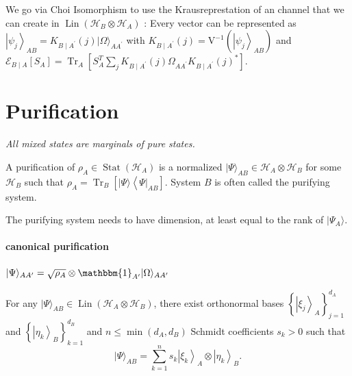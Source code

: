 \begin{remark}
  We go via Choi Isomorphism to use the Krausreprestation of an channel that we can create in $\operatorname{Lin}(\mathcal{H}_B \otimes \mathcal{H}_A)$
  : Every vector can be represented as $\left|\psi_j\right\rangle_{A B}=K_{B \mid A^{\prime}}(j)|\Omega\rangle_{A A^{\prime}}$ with $K_{B \mid A^{\prime}}(j)=\mathrm{V}^{-1}\left(\left|\psi_j\right\rangle_{A B}\right)$
  and $\mathcal{E}_{B \mid A}\left[S_A\right]=\operatorname{Tr}_A\left[S_A^T \sum_j K_{B \mid A^{\prime}}(j) \Omega_{A A^{\prime}} K_{B \mid A^{\prime}}(j)^*\right]$. 
\end{remark}

\section{Purification}
\emph{All mixed states are marginals of pure states.}

\begin{definition}[Purification]
  A purification of $\rho_A \in \operatorname{Stat}\left(\mathcal{H}_A\right)$ is a normalized 
  $|\Psi\rangle_{A B} \in \mathcal{H}_A \otimes \mathcal{H}_B$ for some $\mathcal{H}_B$ such that 
  $\rho_A=\operatorname{Tr}_B\left[|\Psi\rangle\left\langle\left.\Psi\right|_{A B}\right]\right.$. System $B$ 
  is often called the purifying system.
\end{definition}

The purifying system needs to have dimension, at least equal to the rank of $|\Psi_A\rangle$.

\paragraph{canonical purification} $|\Psi\rangle_{A A^{\prime}}=\sqrt{\rho_A} \otimes \mathbbm{1}_{A^{\prime}}|\Omega\rangle_{A A^{\prime}}$

\begin{proposition}
  For any $|\Psi\rangle_{A B} \in \operatorname{Lin}\left(\mathcal{H}_A \otimes \mathcal{H}_B\right)$, there exist orthonormal bases $\left\{\left|\xi_j\right\rangle_A\right\}_{j=1}^{d_A}$
  and $\left\{\left|\eta_k\right\rangle_B\right\}_{k=1}^{d_B}$ and $n \leq \min \left(d_A, d_B\right)$ Schmidt coefficients $s_k>0$ such that
$$
|\Psi\rangle_{A B}=\sum_{k=1}^n s_k\left|\xi_k\right\rangle_A \otimes\left|\eta_k\right\rangle_B .
$$
\end{proposition}

